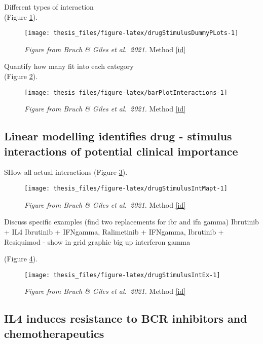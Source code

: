 \documentclass[11pt, a4paper, twosided]{book}
\begin{document}
Different types of interaction\\
(Figure \ref{fig:drugStimulusDummyPLots}).


\begin{figure}

{\centering \texttt{[image: thesis\_files/figure-latex/drugStimulusDummyPLots-1]} 

}

\caption{\emph{Figure from Bruch \& Giles et al.~2021.} Method \ref{id}}\label{fig:drugStimulusDummyPLots}
\end{figure}
Quantify how many fit into each category\\
(Figure \ref{fig:barPlotInteractions}).


\begin{figure}

{\centering \texttt{[image: thesis\_files/figure-latex/barPlotInteractions-1]} 

}

\caption{\emph{Figure from Bruch \& Giles et al.~2021.} Method \ref{id}}\label{fig:barPlotInteractions}
\end{figure}
\hypertarget{ID}{%
\subsection{Linear modelling identifies drug - stimulus interactions of potential clinical importance}\label{ID}}

SHow all actual interactions
(Figure \ref{fig:drugStimulusIntMapt}).


\begin{figure}

{\centering \texttt{[image: thesis\_files/figure-latex/drugStimulusIntMapt-1]} 

}

\caption{\emph{Figure from Bruch \& Giles et al.~2021.} Method \ref{id}}\label{fig:drugStimulusIntMapt}
\end{figure}
Discuss specific examples
(find two replacements for ibr and ifn gamma)
Ibrutinib + IL4 Ibrutinib + IFNgamma, Ralimetinib + IFNgamma, Ibrutinib + Resiquimod - show in grid graphic
big up interferon gamma

(Figure \ref{fig:drugStimulusIntEx}).


\begin{figure}

{\centering \texttt{[image: thesis\_files/figure-latex/drugStimulusIntEx-1]} 

}

\caption{\emph{Figure from Bruch \& Giles et al.~2021.} Method \ref{id}}\label{fig:drugStimulusIntEx}
\end{figure}
\hypertarget{IL4resistance}{%
\subsection{IL4 induces resistance to BCR inhibitors and chemotherapeutics}\label{IL4resistance}}
\end{document}
